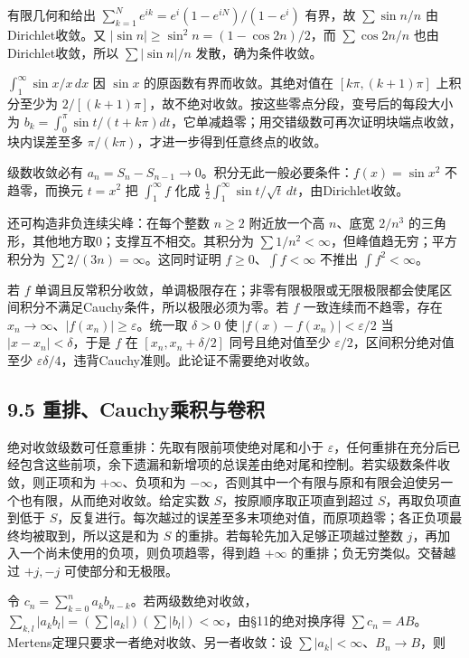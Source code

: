 \documentclass[11pt,a4paper]{article}
\begin{document}
有限几何和给出 \(\sum_{k=1}^Ne^{ik}=e^i(1-e^{iN})/(1-e^i)\) 有界，故
\(\sum\sin n/n\) 由Dirichlet收敛。又
\(|\sin n|\ge\sin^2n=(1-\cos2n)/2\)，而 \(\sum\cos2n/n\)
也由Dirichlet收敛，所以 \(\sum|\sin n|/n\) 发散，确为条件收敛。

\(\int_1^\infty\sin x/x\,dx\) 因 \(\sin x\)
的原函数有界而收敛。其绝对值在 \([k\pi,(k+1)\pi]\) 上积分至少为
\(2/[(k+1)\pi]\)，故不绝对收敛。按这些零点分段，变号后的每段大小为
\(b_k=\int_0^\pi\sin t/(t+k\pi)dt\)，它单减趋零；用交错级数可再次证明块端点收敛，块内误差至多
\(\pi/(k\pi)\)，才进一步得到任意终点的收敛。

级数收敛必有
\(a_n=S_n-S_{n-1}\to0\)。积分无此一般必要条件：\(f(x)=\sin x^2\)
不趋零，而换元 \(t=x^2\) 把 \(\int_1^\infty f\) 化成
\(\frac12\int_1^\infty\sin t/\sqrt t\,dt\)，由Dirichlet收敛。

还可构造非负连续尖峰：在每个整数 \(n\ge2\) 附近放一个高 \(n\)、底宽
\(2/n^3\) 的三角形，其他地方取0；支撑互不相交。其积分为
\(\sum1/n^2<\infty\)，但峰值趋无穷；平方积分为
\(\sum2/(3n)=\infty\)。这同时证明 \(f\ge0\)、\(\int f<\infty\) 不推出
\(\int f^2<\infty\)。

若 \(f\)
单调且反常积分收敛，单调极限存在；非零有限极限或无限极限都会使尾区间积分不满足Cauchy条件，所以极限必须为零。若
\(f\) 一致连续而不趋零，存在
\(x_n\to\infty\)、\(|f(x_n)|\ge\varepsilon\)。统一取 \(\delta>0\) 使
\(|f(x)-f(x_n)|<\varepsilon/2\) 当 \(|x-x_n|<\delta\)，于是 \(f\) 在
\([x_n,x_n+\delta/2]\) 同号且绝对值至少
\(\varepsilon/2\)，区间积分绝对值至少
\(\varepsilon\delta/4\)，违背Cauchy准则。此论证不需要绝对收敛。

\subsection{9.5
重排、Cauchy乘积与卷积}\label{ux91cdux6392cauchyux4e58ux79efux4e0eux5377ux79ef}

绝对收敛级数可任意重排：先取有限前项使绝对尾和小于
\(\varepsilon\)，任何重排在充分后已经包含这些前项，余下遗漏和新增项的总误差由绝对尾和控制。若实级数条件收敛，则正项和为
\(+\infty\)、负项和为
\(-\infty\)，否则其中一个有限与原和有限会迫使另一个也有限，从而绝对收敛。给定实数
\(S\)，按原顺序取正项直到超过 \(S\)，再取负项直到低于
\(S\)，反复进行。每次越过的误差至多末项绝对值，而原项趋零；各正负项最终均被取到，所以这是和为
\(S\) 的重排。若每轮先加入足够正项越过整数
\(j\)，再加入一个尚未使用的负项，则负项趋零，得到趋 \(+\infty\)
的重排；负无穷类似。交替越过 \(+j,-j\) 可使部分和无极限。

令
\(c_n=\sum_{k=0}^na_kb_{n-k}\)。若两级数绝对收敛，\(\sum_{k,l}|a_kb_l|=(\sum|a_k|)(\sum|b_l|)<\infty\)，由§11的绝对换序得
\(\sum c_n=AB\)。Mertens定理只要求一者绝对收敛、另一者收敛：设
\(\sum|a_k|<\infty\)、\(B_n\to B\)，则
\end{document}
